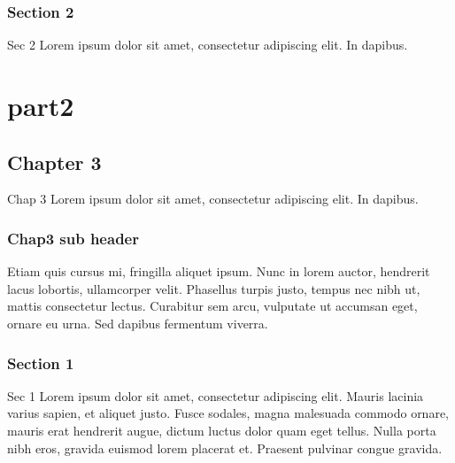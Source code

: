 \sphinxstepscope


\section{Section 2}
\label{\detokenize{part1/sec2:section-2}}\label{\detokenize{part1/sec2::doc}}
\sphinxAtStartPar
Sec 2 Lorem ipsum dolor sit amet, consectetur adipiscing elit. In dapibus.

\sphinxstepscope


\part{part2}

\sphinxstepscope


\chapter{Chapter 3}
\label{\detokenize{part2/chap3:chapter-3}}\label{\detokenize{part2/chap3::doc}}
\sphinxAtStartPar
Chap 3 Lorem ipsum dolor sit amet, consectetur adipiscing elit. In dapibus.


\section{Chap3 sub header}
\label{\detokenize{part2/chap3:chap3-sub-header}}
\sphinxAtStartPar
Etiam quis cursus mi, fringilla aliquet ipsum. Nunc in lorem auctor, hendrerit lacus lobortis, ullamcorper velit. Phasellus turpis justo, tempus nec nibh ut, mattis consectetur lectus. Curabitur sem arcu, vulputate ut accumsan eget, ornare eu urna. Sed dapibus fermentum viverra.

\sphinxstepscope


\section{Section 1}
\label{\detokenize{part2/sec1:section-1}}\label{\detokenize{part2/sec1::doc}}
\sphinxAtStartPar
Sec 1 Lorem ipsum dolor sit amet, consectetur adipiscing elit. Mauris lacinia varius sapien, et aliquet justo. Fusce sodales, magna malesuada commodo ornare, mauris erat hendrerit augue, dictum luctus dolor quam eget tellus. Nulla porta nibh eros, gravida euismod lorem placerat et. Praesent pulvinar congue gravida.

